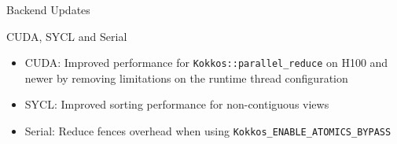 
\begin{frame}[fragile]

  {\Huge Backend Updates}

  \vspace{10pt}

\end{frame}





\begin{frame}[fragile]{CUDA, SYCL and Serial}
  \begin{itemize}
      \item CUDA: Improved performance for \texttt{Kokkos::parallel\_reduce} on H100 and newer by removing limitations on the runtime thread configuration
      \item SYCL: Improved sorting performance for non-contiguous views
      \item Serial: Reduce fences overhead when using \texttt{Kokkos\_ENABLE\_ATOMICS\_BYPASS}
  \end{itemize}
\end{frame}

